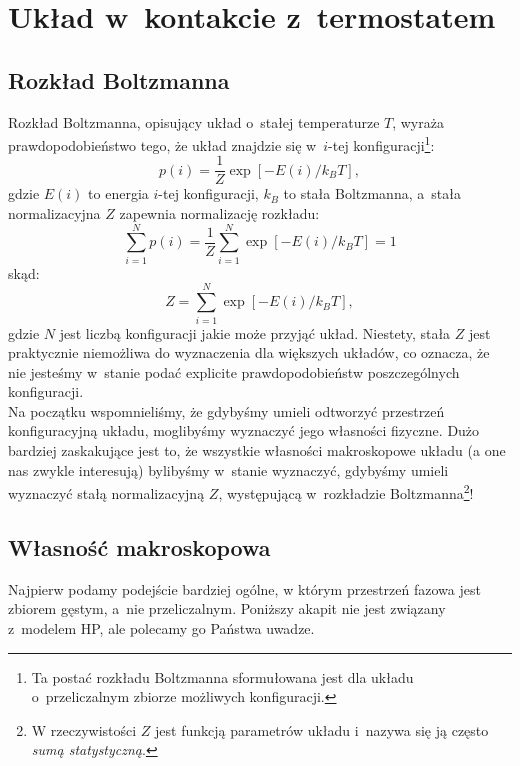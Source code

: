 \documentclass[a4paper,11pt,twoside]{book}
\begin{document}
\chapter{Układ w~kontakcie z~termostatem}
\section{Rozkład Boltzmanna}
Rozkład Boltzmanna, opisujący układ o~stałej temperaturze $T$, wyraża prawdopodobieństwo tego, że układ znajdzie się w~$i$-tej konfiguracji\footnote{Ta postać rozkładu Boltzmanna sformułowana jest dla układu o~przeliczalnym zbiorze możliwych konfiguracji.}:
\begin{equation}
p(i) = \frac{1}{Z} \exp [−E(i)/k_B T ], \label{Boltzmann}
\end{equation}
gdzie $E(i)$ to energia $i$-tej konfiguracji, $k_B$ to stała Boltzmanna, a~stała normalizacyjna $Z$ zapewnia normalizację rozkładu:
\begin{displaymath}
\sum_{i=1}^N p(i) = \frac{1}{Z} \sum_{i=1}^N \exp [ -E(i)/k_B T ]= 1
\end{displaymath}
skąd:
\begin{displaymath}
Z = \sum_{i=1}^N \exp [-E(i) / k_B T],
\end{displaymath}
gdzie $N$ jest liczbą konfiguracji jakie może przyjąć układ. Niestety, stała $Z$ jest praktycznie niemożliwa do wyznaczenia dla większych układów, co oznacza, że nie jesteśmy w~stanie podać explicite prawdopodobieństw poszczególnych konfiguracji.\\

Na początku wspomnieliśmy, że gdybyśmy umieli odtworzyć przestrzeń konfiguracyjną układu, moglibyśmy wyznaczyć jego własności fizyczne. Dużo bardziej zaskakujące jest to, że wszystkie własności makroskopowe układu (a one nas zwykle interesują) bylibyśmy w~stanie wyznaczyć, gdybyśmy umieli wyznaczyć stałą normalizacyjną $Z$, występującą w~rozkładzie Boltzmanna\footnote{W rzeczywistości $Z$ jest funkcją parametrów układu i~nazywa się ją często \emph{sumą statystyczną}.}!
\section{Własność makroskopowa}
Najpierw podamy podejście bardziej ogólne,
w którym przestrzeń fazowa jest zbiorem gęstym, a~nie przeliczalnym. Poniższy akapit nie jest związany z~modelem HP, ale polecamy go Państwa uwadze.\\
\end{document}
